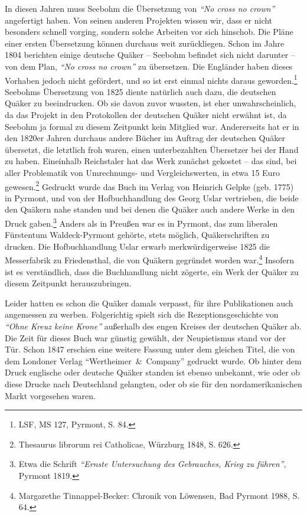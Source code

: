In diesen Jahren muss Seebohm die Übersetzung von \textit{"`No cross no crown"'}
angefertigt haben. Von seinen anderen Projekten wissen wir, dass er nicht
besonders schnell vorging, sondern solche Arbeiten vor sich hinschob. Die Pläne
einer ersten Übersetzung können durchaus weit zurückliegen. Schon im Jahre 1804
berichten einige deutsche Quäker -- Seebohm befindet sich nicht darunter -- von
dem Plan, \textit{"`No cross no crown"'} zu übersetzen. Die Engländer haben dieses
Vorhaben jedoch nicht gefördert, und so ist erst einmal nichts daraus
geworden.\footnote{LSF, MS 127, Pyrmont, S. 84.} Seebohms Übersetzung von 1825
diente natürlich auch dazu, die deutschen Quäker zu beeindrucken. Ob sie davon
zuvor wussten, ist eher unwahrscheinlich, da das Projekt in den Protokollen der
deutschen Quäker nicht erwähnt ist, da Seebohm ja formal zu diesem Zeitpunkt
kein Mitglied war. Andererseits hat er in den 1820er Jahren durchaus andere
Bücher im Auftrag der deutschen Quäker übersetzt, die letztlich froh waren,
einen unterbezahlten Übersetzer bei der Hand zu haben. Eineinhalb Reichstaler
hat das Werk zunächst gekostet -- das sind, bei aller Problematik von
Umrechnungs- und Vergleichswerten, in etwa 15 Euro gewesen.\footnote{Thesaurus
librorum rei Catholicae, Würzburg 1848, S. 626.} Gedruckt wurde das Buch im
Verlag von Heinrich Gelpke (geb. 1775) in Pyrmont, und von der Hofbuchhandlung
des Georg Uslar vertrieben, die beide den Quäkern nahe standen und bei denen die
Quäker auch andere Werke in den Druck gaben.\footnote{Etwa die Schrift \textit{"`Ernste
Untersuchung des Gebrauches, Krieg zu führen"'},
Pyrmont 1819.} Anders als in Preußen war es in
Pyrmont, das zum liberalen Fürstentum Waldeck-Pyrmont gehörte, stets möglich,
Quäkerschriften zu drucken. Die Hofbuchhandlung Uslar erwarb merkwürdigerweise
1825 die Messerfabrik zu Friedensthal, die von Quäkern gegründet worden
war.\footnote{Margarethe Tinnappel-Becker: Chronik von Löwensen, Bad Pyrmont
1988, S. 64.} Insofern ist es verständlich, dass die Buchhandlung nicht zögerte,
ein Werk der Quäker zu diesem Zeitpunkt herauszubringen.

\medskip


Leider hatten es schon die Quäker damals verpasst, für ihre Publikationen auch
angemessen zu werben. Folgerichtig spielt sich die Rezeptionsgeschichte von
\textit{"`Ohne Kreuz keine Krone"'} außerhalb des engen Kreises der deutschen Quäker ab.
Die Zeit für dieses Buch war günstig gewählt, der Neupietismus  stand vor der
Tür. Schon 1847 erschien eine weitere Fassung unter dem gleichen Titel, die von
dem Londoner Verlag "`Wertheimer~\&~Company"' gedruckt wurde. Ob hinter dem
Druck englische oder deutsche Quäker standen ist ebenso unbekannt, wie oder ob
diese Drucke nach Deutschland gelangten, oder ob sie für den nordamerikanischen
Markt vorgesehen waren.

